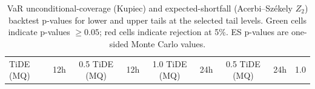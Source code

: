 \begin{table}[ht]
\begin{tabular}{l c c c c c c}
\midrule
TiDE (MQ) & 12h & 0.5%
TiDE (MQ) & 12h & 1.0%
\midrule
TiDE (MQ) & 24h & 0.5%
TiDE (MQ) & 24h & 1.0%
\midrule
\bottomrule
\end{tabular}
\caption{VaR unconditional-coverage (Kupiec) and expected-shortfall (Acerbi--Sz\'ekely $Z_2$) backtest p-values for lower and upper tails at the selected tail levels. Green cells indicate p-values $\geq 0.05$; red cells indicate rejection at 5\%. ES p-values are one-sided Monte Carlo values.}
\label{tab:var_es_backtests_comparison}
\end{table}
